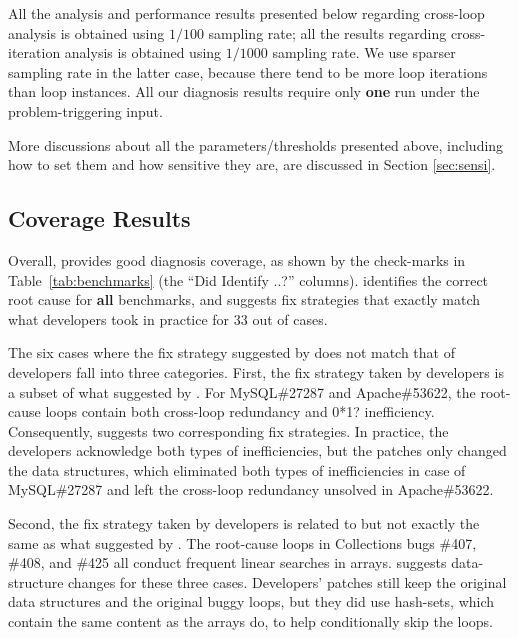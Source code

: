 All the analysis and performance results presented below regarding
cross-loop analysis is obtained using $1/100$ sampling rate; all the
results regarding cross-iteration analysis is obtained using $1/1000$ sampling
rate. We use sparser sampling rate in the latter case, because there tend to
be more loop iterations than loop instances.
All our diagnosis results require only \textbf{one} run under the 
problem-triggering input.

More discussions about all the parameters/thresholds presented above, including
how to set them and how sensitive they are, are discussed in Section
\ref{sec:sensi}. 

\subsection{Coverage Results}
\label{sec:coverage}
Overall, \Tool provides good diagnosis coverage, as shown by the check-marks in Table~\ref{tab:benchmarks}
(the ``Did \Tool Identify ..?'' columns). 
\Tool identifies the correct root cause for \textbf{all} \allbugs benchmarks, and 
suggests fix strategies that exactly match what developers took in practice
for 33 out of \allbugs cases. 

The six cases where the fix strategy suggested by \Tool does not match that of 
developers fall into three categories.
First, the fix strategy taken by developers is a subset of what suggested by 
\Tool.
For MySQL\#27287 and Apache\#53622, the root-cause loops contain both
cross-loop redundancy and 0*1? inefficiency. Consequently, \Tool suggests two
corresponding fix strategies. In practice, the developers
acknowledge both types of inefficiencies, but the patches
only changed the data structures, which eliminated both types of inefficiencies 
in case of MySQL\#27287 and left the cross-loop redundancy unsolved in
Apache\#53622. 

Second, the fix strategy taken by developers is related to but not exactly the same as
what suggested by \Tool.
The root-cause loops in 
Collections bugs \#407, \#408, and \#425 all conduct frequent linear searches in arrays.
\Tool suggests data-structure changes for these three cases. Developers' patches 
still keep the original data structures and the original buggy loops, but they
did use hash-sets, which contain the same content as the arrays do,
to help conditionally skip the loops. 

